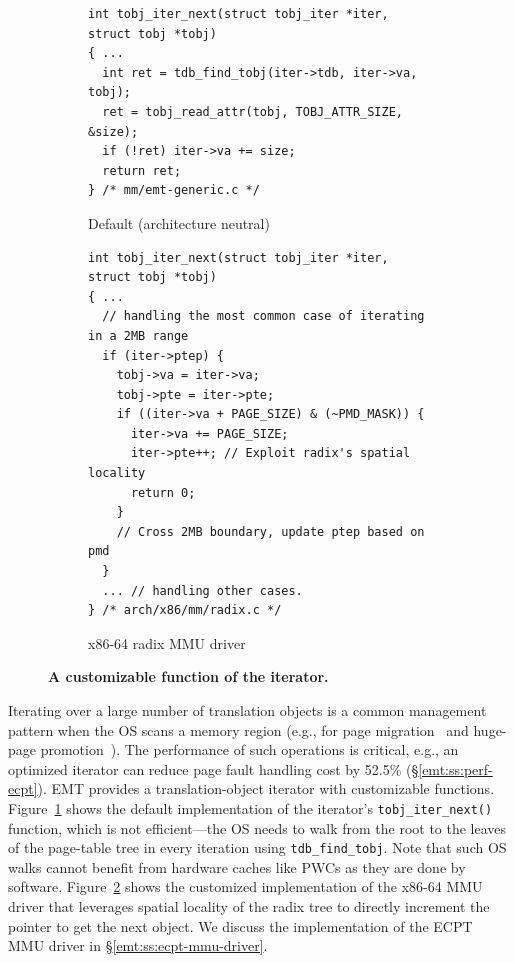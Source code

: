\begin{figure}[tbp]
\begin{subfigure}[b]{\textwidth}
\begin{verbatim}
int tobj_iter_next(struct tobj_iter *iter, struct tobj *tobj)
{ ...
  int ret = tdb_find_tobj(iter->tdb, iter->va, tobj);
  ret = tobj_read_attr(tobj, TOBJ_ATTR_SIZE, &size);
  if (!ret) iter->va += size;
  return ret;
} /* mm/emt-generic.c */
\end{verbatim}
\captionsetup{justification=centering}
\caption{Default (architecture neutral)}
\label{emt:code:iternext-gen}
\end{subfigure}
\begin{subfigure}[b]{\textwidth}
\begin{verbatim}
int tobj_iter_next(struct tobj_iter *iter, struct tobj *tobj)
{ ...
  // handling the most common case of iterating in a 2MB range
  if (iter->ptep) {
    tobj->va = iter->va;
    tobj->pte = iter->pte;
    if ((iter->va + PAGE_SIZE) & (~PMD_MASK)) {
      iter->va += PAGE_SIZE;
      iter->pte++; // Exploit radix's spatial locality
      return 0;
    }
    // Cross 2MB boundary, update ptep based on pmd
  }
  ... // handling other cases.
} /* arch/x86/mm/radix.c */
\end{verbatim}
\captionsetup{justification=centering}
\caption{x86-64 radix MMU driver} %
\label{emt:code:iternext-x86}
\end{subfigure}

\caption{\bf A customizable function of the iterator.}
\label{emt:code:iternext}
\end{figure}

Iterating over a large number of translation objects %
	is a common management pattern when the OS scans a memory region
	(e.g., for page migration~\cite{linux:migration} and huge-page promotion~\cite{linux:thp}).
The performance of such operations is critical, e.g., 
	an optimized iterator
	can reduce page fault handling cost by 52.5\% (\S\ref{emt:ss:perf-ecpt}).
EMT provides a translation-object iterator with customizable functions.
Figure~\ref{emt:code:iternext-gen} shows the default implementation of the iterator's \texttt{\small tobj\_iter\_next()} 
	function, which is not efficient---the
	OS needs to walk from the root to the leaves of the page-table tree 
	in every iteration using \texttt{\small tdb\_find\_tobj}.
Note that such OS walks cannot benefit from hardware caches like PWCs as they are done by software.
Figure~\ref{emt:code:iternext-x86} shows the customized implementation of the x86-64 MMU driver
	that leverages
	spatial locality of the radix tree to directly increment the pointer to get the next object.
We discuss the implementation of the ECPT MMU driver in \S\ref{emt:ss:ecpt-mmu-driver}.


